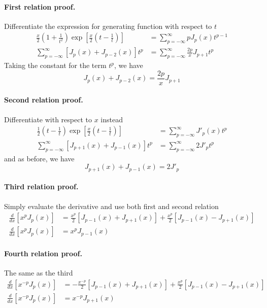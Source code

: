 \documentclass[../main.tex]{subfiles}
\begin{document}
\paragraph*{First relation proof.} Differentiate the expression for generating function with respect to $t$
\begin{align*}
    \frac{x}{2}\left(1+\frac{1}{t^2}\right)\exp\left[\frac{x}{2}\left(t-\frac{1}{t}\right)\right]&=\sum_{p=-\infty}^{\infty}pJ_p(x)t^{p-1}\\
    \sum_{p=-\infty}^{\infty}\left[J_p(x)+J_{p-2}(x)\right]t^p&= \sum_{p=-\infty}^{\infty}\frac{2p}{x}J_{p+1}t^{p}
\end{align*}
Taking the constant for the term $t^p$, we have 
\begin{equation*}
    J_p(x)+J_{p-2}(x)=\frac{2p}{x}J_{p+1} 
\end{equation*}

\paragraph*{Second relation proof.} Differentiate with respect to $x$ instead 
\begin{align*}
    \frac{1}{2}\left(t-\frac{1}{t}\right)\exp\left[\frac{x}{2}\left(t-\frac{1}{t}\right)\right]&=\sum_{p=-\infty}^{\infty}J'_p(x)t^{p}\\
    \sum_{p=-\infty}^{\infty}\left[J_{p+1}(x)+J_{p-1}(x)\right]t^p&= \sum_{p=-\infty}^{\infty}2J'_pt^{p}
\end{align*}
and as before, we have 
\begin{equation*}
    J_{p+1}(x)+J_{p-1}(x)=2J'_p
\end{equation*}

\paragraph*{Third relation proof.} Simply evaluate the derivative and use both first and second relation
\begin{align*}
    \frac{d}{dx}\left[x^pJ_p(x)\right]&= \frac{x^p}{2}\left[J_{p-1}(x)+J_{p+1}(x)\right]+\frac{x^p}{2}\left[J_{p-1}(x)-J_{p+1}(x)\right]\\
    \frac{d}{dx}\left[x^pJ_p(x)\right]&=x^pJ_{p-1}(x)
\end{align*}

\paragraph*{Fourth relation proof.} The same as the third 
\begin{align*}
    \frac{d}{dx}\left[x^{-p}J_p(x)\right]&= -\frac{x^{-p}}{2}\left[J_{p-1}(x)+J_{p+1}(x)\right]+\frac{x^p}{2}\left[J_{p-1}(x)-J_{p+1}(x)\right]\\
    \frac{d}{dx}\left[x^{-p}J_p(x)\right]&=x^{-p}J_{p+1}(x)
\end{align*}
\end{document}
